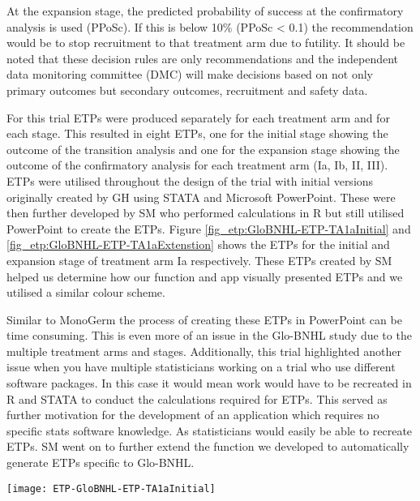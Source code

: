 At the expansion stage, the predicted probability of success at the confirmatory analysis is used (PPoSc). If this is below 10\% (PPoSc < 0.1) the recommendation would be to stop recruitment to that treatment arm due to futility. It should be noted that these decision rules are only recommendations and the independent data monitoring committee (DMC) will make decisions based on not only primary outcomes but secondary outcomes, recruitment and safety data. 

For this trial ETPs were produced separately for each treatment arm and for each stage. This resulted in eight ETPs, one for the initial stage showing the outcome of the transition analysis and one for the expansion stage showing the outcome of the confirmatory analysis for each treatment arm (\RN{1}a, \RN{1}b, \RN{2}, \RN{3}). ETPs were utilised throughout the design of the trial with initial versions originally created by GH using STATA and Microsoft PowerPoint. These were then further developed by SM who performed calculations in R but still utilised PowerPoint to create the ETPs. Figure \ref{fig_etp:GloBNHL-ETP-TA1aInitial} and \ref{fig_etp:GloBNHL-ETP-TA1aExtenstion} shows the ETPs for the initial and expansion stage of treatment arm \RN{1}a respectively. These ETPs created by SM helped us determine how our function and app visually presented ETPs and we utilised a similar colour scheme. 

Similar to MonoGerm the process of creating these ETPs in PowerPoint can be time consuming. This is even more of an issue in the Glo-BNHL study due to the multiple treatment arms and stages. Additionally, this trial highlighted another issue when you have multiple statisticians working on a trial who use different software packages. In this case it would mean work would have to be recreated in R and STATA to conduct the calculations required for ETPs. This served as further motivation for the development of an application which requires no specific stats software knowledge. As statisticians would easily be able to recreate ETPs. SM went on to further extend the function we developed to automatically generate ETPs specific to Glo-BNHL. 

\begin{sidewaysfigure}[h!]
	\centering
	\caption{ETP for the initial stage of treatment arm \RN{1}a in Glo-BNHL.}
	\label{fig_etp:GloBNHL-ETP-TA1aInitial}
	\texttt{[image: ETP-GloBNHL-ETP-TA1aInitial]}
\end{sidewaysfigure} 

